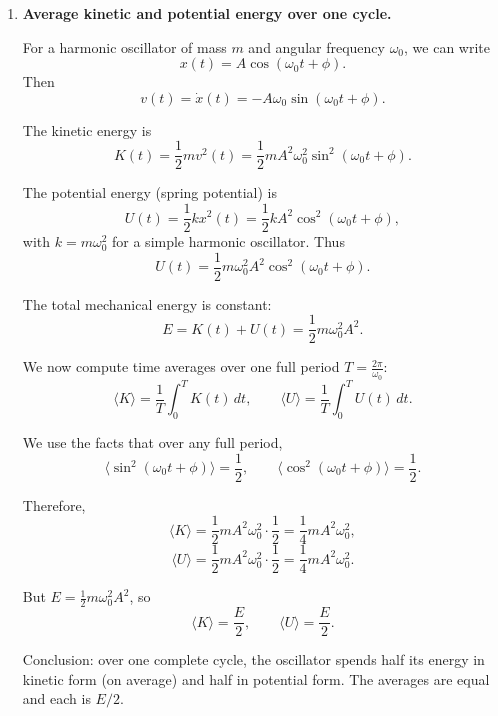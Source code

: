\documentclass[../main.tex]{subfiles}
\begin{document}
\begin{enumerate}
We can also express $\phi$ in terms of $x_0,v_0$ using
\[
\phi = \arctan2\!\left(-\frac{v_0}{A\omega_0}, \frac{x_0}{A}\right),
\]
where $\arctan2(y,x)$ is the correct quadrant angle with $\cos\phi = x_0/A$ and $\sin\phi = -v_0/(A\omega_0)$.

Summary: the first time the oscillator reaches an endpoint ($|x|=A$) after $t=0$ is given by the smallest positive member of $t_n = (n\pi-\phi)/\omega_0$.

Physically: the oscillator reaches maximum displacement whenever its velocity first becomes zero.


\item \textbf{Average kinetic and potential energy over one cycle.}

For a harmonic oscillator of mass $m$ and angular frequency $\omega_0$, we can write
\[
x(t) = A \cos(\omega_0 t + \phi).
\]
Then
\[
v(t) = \dot{x}(t) = -A \omega_0 \sin(\omega_0 t + \phi).
\]

The kinetic energy is
\[
K(t) = \frac{1}{2} m v^2(t)
= \frac{1}{2} m A^2 \omega_0^2 \sin^2(\omega_0 t + \phi).
\]

The potential energy (spring potential) is
\[
U(t) = \frac{1}{2} k x^2(t)
= \frac{1}{2} k A^2 \cos^2(\omega_0 t + \phi),
\]
with $k = m \omega_0^2$ for a simple harmonic oscillator. Thus
\[
U(t) = \frac{1}{2} m \omega_0^2 A^2 \cos^2(\omega_0 t + \phi).
\]

The total mechanical energy is constant:
\[
E = K(t)+U(t)
= \frac{1}{2} m \omega_0^2 A^2.
\]

We now compute time averages over one full period $T = \frac{2\pi}{\omega_0}$:
\[
\langle K \rangle
= \frac{1}{T} \int_0^T K(t)\, dt,
\qquad
\langle U \rangle
= \frac{1}{T} \int_0^T U(t)\, dt.
\]

We use the facts that over any full period,
\[
\langle \sin^2(\omega_0 t + \phi) \rangle = \frac{1}{2},
\qquad
\langle \cos^2(\omega_0 t + \phi) \rangle = \frac{1}{2}.
\]

Therefore,
\[
\langle K \rangle
= \frac{1}{2} m A^2 \omega_0^2 \cdot \frac{1}{2}
= \frac{1}{4} m A^2 \omega_0^2,
\]
\[
\langle U \rangle
= \frac{1}{2} m A^2 \omega_0^2 \cdot \frac{1}{2}
= \frac{1}{4} m A^2 \omega_0^2.
\]

But $E = \tfrac{1}{2} m \omega_0^2 A^2$, so
\[
\langle K \rangle = \frac{E}{2},
\qquad
\langle U \rangle = \frac{E}{2}.
\]

Conclusion: over one complete cycle, the oscillator spends half its energy in kinetic form (on average) and half in potential form. The averages are equal and each is $E/2$.



\end{enumerate}
\end{document}
